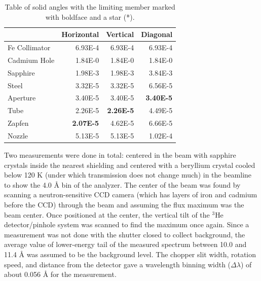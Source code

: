 \documentclass[5p,12pt]{elsarticle}
\begin{document}
\begin{table}
\scriptsize
\begin{center}
     \caption{Table of solid angles with the limiting member marked with boldface and a star (*).  \label{tab:sa} }
\begin{tabular}{|l|r|r|r|}
     \hline
                   &     Horizontal  &     Vertical   &     Diagonal   \\
     \hline
     Fe Collimator &     6.93E-4  &     6.93E-4 &     6.93E-4 \\
     \hline 
     Cadmium Hole  &     1.84E-0  &     1.84E-0 &     1.84E-0 \\
     \hline 
     Sapphire      &     1.98E-3  &     1.98E-3 &     3.84E-3 \\
     \hline 
     Steel         &     3.32E-5  &     3.32E-5 &     6.56E-5 \\
     \hline
     Aperture      &     3.40E-5  &     3.40E-5 &\bf* 3.40E-5 \\
     \hline
     Tube          &     2.26E-5  &\bf* 2.26E-5 &     4.49E-5  \\
     \hline
     Zapfen        &\bf* 2.07E-5  &     4.62E-5 &     6.66E-5 \\
     \hline
     Nozzle        &     5.13E-5  &     5.13E-5 &     1.02E-4 \\
     \hline
\end{tabular}
\end{center}
\end{table}

Two measurements were done in total: centered in the beam with sapphire crystals inside the nearest shielding and centered with a beryllium crystal cooled below 120 K (under which transmission does not change much) in the beamline to show the 4.0 {\AA} bin of the analyzer.  The center of the beam was found by scanning a neutron-sensitive CCD camera (which has layers of iron and cadmium before the CCD) through the beam and assuming the flux maximum was the beam center.  Once positioned at the center, the vertical tilt of the $^3$He detector/pinhole system was scanned to find the maximum once again.  Since a measurement was not done with the shutter closed to collect background, the average value of lower-energy tail of the measured spectrum between 10.0 and 11.4 {\AA} was assumed to be the background level.  The chopper slit width, rotation speed, and distance from the detector gave a wavelength binning width ($\Delta\lambda$) of about 0.056 {\AA} for the measurement.
\end{document}
